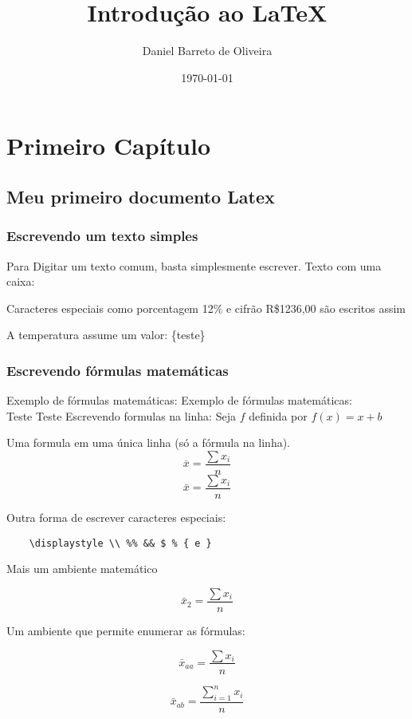 \documentclass[a4paper, 11pt]{book}  %
\author{Daniel Barreto de Oliveira}
\title{Introdução ao LaTeX}
\date{\today}
\begin{document}
\maketitle
\chapter{Primeiro Capítulo} %
\section{Meu primeiro documento Latex}
\subsection{Escrevendo um texto simples}
Para Digitar um texto comum, basta simplesmente escrever.
Texto com uma caixa: 

Caracteres especiais como porcentagem 12\% e cifrão R\$1236,00 são escritos assim

A temperatura assume um valor: \{teste\}


\subsection{Escrevendo fórmulas matemáticas}
Exemplo de fórmulas matemáticas: \newline
Exemplo de fórmulas matemáticas: \\
Teste
Teste
Escrevendo formulas na linha: Seja $f$ definida por $f(x)=x+b$

Uma formula em uma única linha (só a fórmula na linha).
$$\overline{x} = \frac{\sum x_{i}}{n}$$
$$\bar{x} = \frac{\sum x_{i}}{n}$$

Outra forma de escrever caracteres especiais:
\begin{verbatim}
    \displaystyle \\ %% && $ % { e }
\end{verbatim}

Mais um ambiente matemático

\[
    \bar{x}_{2} =   \frac{\sum{x_{i}}}{n}
\]

Um ambiente que permite enumerar as fórmulas:

\begin{equation}
    \bar{x}_{aa} = \frac{\sum{x_{i}}}{n}
    \label{mediaaa}
\end{equation}

\begin{equation}
    \bar{x}_{ab} = \frac{\sum_{i=1}^{n}{x_{i}}}{n}
\end{equation}
\end{document}
